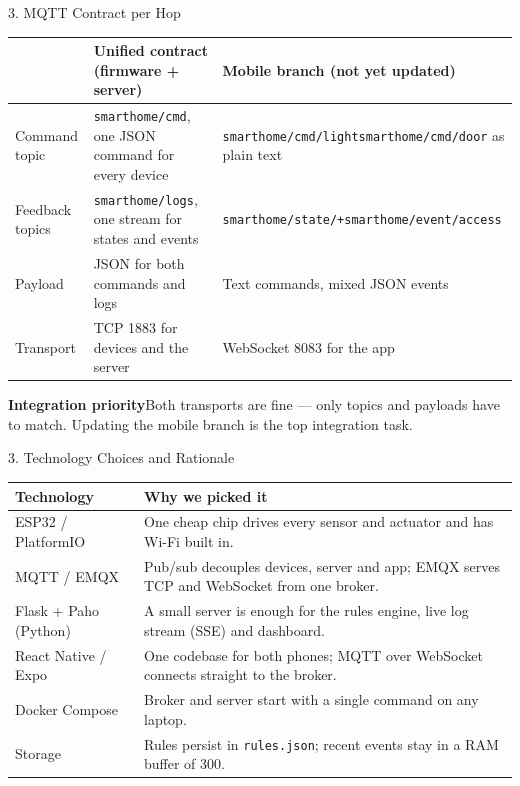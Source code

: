\documentclass[aspectratio=169,11pt]{beamer}
\renewcommand{\arraystretch}{1.18}
\begin{document}
\begin{frame}{3. MQTT Contract per Hop}
  \small
  \begin{tabularx}{\textwidth}{@{}p{2.8cm}XX@{}}
    \toprule
    & \textbf{Unified contract (firmware + server)} & \textbf{Mobile branch (not yet updated)} \\
    \midrule
    Command topic & \texttt{smarthome/cmd}, one JSON command for every device & \texttt{smarthome/cmd/light}\newline\texttt{smarthome/cmd/door} as plain text \\
    Feedback topics & \texttt{smarthome/logs}, one stream for states and events & \texttt{smarthome/state/+}\newline\texttt{smarthome/event/access} \\
    Payload & JSON for both commands and logs & Text commands, mixed JSON events \\
    Transport & TCP 1883 for devices and the server & WebSocket 8083 for the app \\
    \bottomrule
  \end{tabularx}
  \vspace{0.35cm}
  \textcolor{AccentRed}{\bfseries Integration priority}\quad Both transports are fine --- only topics and payloads have to match. Updating the mobile branch is the top integration task.
\end{frame}

\begin{frame}{3. Technology Choices and Rationale}
  \small
  \begingroup
  \renewcommand{\arraystretch}{1.25}
  \begin{tabularx}{\textwidth}{@{}>{\raggedright\arraybackslash}p{3.4cm}>{\raggedright\arraybackslash}X@{}}
    \toprule
    \textbf{Technology} & \textbf{Why we picked it} \\
    \midrule
    ESP32 / PlatformIO & One cheap chip drives every sensor and actuator and has Wi-Fi built in. \\
    MQTT / EMQX & Pub/sub decouples devices, server and app; EMQX serves TCP and WebSocket from one broker. \\
    Flask + Paho (Python) & A small server is enough for the rules engine, live log stream (SSE) and dashboard. \\
    React Native / Expo & One codebase for both phones; MQTT over WebSocket connects straight to the broker. \\
    Docker Compose & Broker and server start with a single command on any laptop. \\
    Storage & Rules persist in \texttt{rules.json}; recent events stay in a RAM buffer of 300. \\
    \bottomrule
  \end{tabularx}
  \endgroup
\end{frame}
\end{document}
